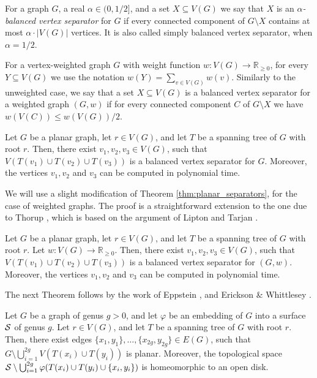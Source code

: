 \documentclass[envcountsect]{llncs}
\renewcommand{\phi}{\varphi}
\begin{document}
For a graph $G$, a real $\alpha\in (0,1/2]$, and a set $X\subseteq V(G)$ we say that $X$ is an \emph{$\alpha$-balanced vertex separator} for $G$ if every connected component of $G\setminus X$ contains at most $\alpha\cdot |V(G)|$ vertices.
It is also called simply balanced vertex separator, when $\alpha=1/2$.

For a vertex-weighted graph $G$ with weight function $w:V(G)\to \mathbb{R}_{\geq 0}$, for every $Y\subseteq V(G)$ we use the notation $w(Y) = \sum_{v\in V(G)} w(v)$.
Similarly to the unweighted case, we say that a set $X\subseteq V(G)$ is a balanced vertex separator for a weighted graph
 $(G,w)$ if for every connected component $C$ of $G\setminus X$ we have $w(V(C)) \leq w(V(G)) / 2$. 

\begin{theorem}\label{thm:planar_separators}
Let $G$ be a planar graph, let $r\in V(G)$, and let $T$ be a spanning tree of $G$ with root $r$.
Then, there exist $v_1, v_2, v_3\in V(G)$, such that $V(T(v_1)\cup T(v_2) \cup T(v_3))$ is a balanced vertex separator for $G$.
Moreover, the vertices $v_1, v_2$ and $v_3$ can be computed in polynomial time.
\end{theorem}

We will use a slight modification of Theorem \ref{thm:planar_separators}, for the case of weighted graphs.
The proof is a straightforward extension to the one due to Thorup \cite{thorup2004compact}, which is based on the argument of Lipton and Tarjan \cite{lipton1979separator}.

\begin{lemma}\label{lem:weighted_planar_separators}
Let $G$ be a planar graph, let $r\in V(G)$, and let $T$ be a spanning tree of $G$ with root $r$.
Let $w:V(G) \to \mathbb{R}_{\geq 0}$.
Then, there exist $v_1, v_2, v_3\in V(G)$, such that $V(T(v_1)\cup T(v_2) \cup T(v_3))$ is a balanced vertex separator for $(G,w)$.
Moreover, the vertices $v_1, v_2$ and $v_3$ can be computed in polynomial time.
\end{lemma}

The next Theorem follows by the work of Eppstein \cite{eppstein2003dynamic}, and Erickson \& Whittlesey \cite{erickson2005greedy}.

\begin{theorem}\label{thm:planarization_spanning}
Let $G$ be a graph of genus $g>0$, and let $\phi$ be an embedding of $G$ into a surface ${\cal S}$ of genus $g$.
Let $r\in V(G)$, and let $T$ be a spanning tree of $G$ with root $r$.
Then, there exist edges $\{x_1,y_1\},\ldots,\{x_{2g},y_{2g}\}\in E(G)$, such that
$G \setminus \bigcup_{i=1}^{2g} V(T(x_i)\cup T(y_i))$ is planar.
Moreover, the topological space ${\cal S} \setminus \bigcup_{i=1}^{2g} \phi(T(x_i)\cup T(y_i)\cup \{x_i,y_i\})$ is homeomorphic to an open disk.
\end{theorem}
\end{document}

